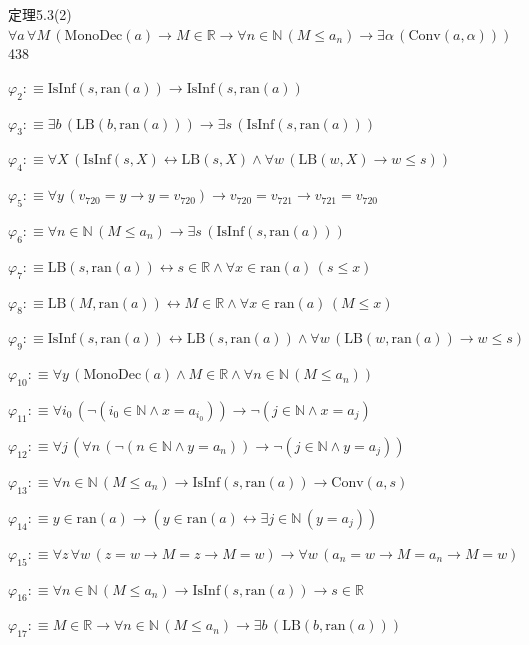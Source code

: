 \begin{fullproof}{定理5.3(2)}{$\forall a\,\forall M\,(\mathrm{MonoDec}(a) \to M \in \mathbb{R} \to \forall n \in \mathbb{N}\,(M \leq a_{n}) \to \exists \alpha\,(\mathrm{Conv}(a,\alpha)))$}{438}
\begin{abbrevlist}
\item $\varphi_{2} :\equiv \mathrm{IsInf}(s,\mathrm{ran}(a)) \to \mathrm{IsInf}(s,\mathrm{ran}(a))$
\item $\varphi_{3} :\equiv \exists b\,(\mathrm{LB}(b,\mathrm{ran}(a))) \to \exists s\,(\mathrm{IsInf}(s,\mathrm{ran}(a)))$
\item $\varphi_{4} :\equiv \forall X\,(\mathrm{IsInf}(s,X) \leftrightarrow \mathrm{LB}(s,X) \land \forall w\,(\mathrm{LB}(w,X) \to w \leq s))$
\item $\varphi_{5} :\equiv \forall y\,(v_{720} = y \to y = v_{720}) \to v_{720} = v_{721} \to v_{721} = v_{720}$
\item $\varphi_{6} :\equiv \forall n \in \mathbb{N}\,(M \leq a_{n}) \to \exists s\,(\mathrm{IsInf}(s,\mathrm{ran}(a)))$
\item $\varphi_{7} :\equiv \mathrm{LB}(s,\mathrm{ran}(a)) \leftrightarrow s \in \mathbb{R} \land \forall x \in \mathrm{ran}(a)\,(s \leq x)$
\item $\varphi_{8} :\equiv \mathrm{LB}(M,\mathrm{ran}(a)) \leftrightarrow M \in \mathbb{R} \land \forall x \in \mathrm{ran}(a)\,(M \leq x)$
\item $\varphi_{9} :\equiv \mathrm{IsInf}(s,\mathrm{ran}(a)) \leftrightarrow \mathrm{LB}(s,\mathrm{ran}(a)) \land \forall w\,(\mathrm{LB}(w,\mathrm{ran}(a)) \to w \leq s)$
\item $\varphi_{10} :\equiv \forall y\,(\mathrm{MonoDec}(a) \land M \in \mathbb{R} \land \forall n \in \mathbb{N}\,(M \leq a_{n}))$
\item $\varphi_{11} :\equiv \forall i_{0}\,(\neg (i_{0} \in \mathbb{N} \land x = a_{i_{0}})) \to \neg (j \in \mathbb{N} \land x = a_{j})$
\item $\varphi_{12} :\equiv \forall j\,(\forall n\,(\neg (n \in \mathbb{N} \land y = a_{n})) \to \neg (j \in \mathbb{N} \land y = a_{j}))$
\item $\varphi_{13} :\equiv \forall n \in \mathbb{N}\,(M \leq a_{n}) \to \mathrm{IsInf}(s,\mathrm{ran}(a)) \to \mathrm{Conv}(a,s)$
\item $\varphi_{14} :\equiv y \in \mathrm{ran}(a) \to (y \in \mathrm{ran}(a) \leftrightarrow \exists j \in \mathbb{N}\,(y = a_{j}))$
\item $\varphi_{15} :\equiv \forall z\,\forall w\,(z = w \to M = z \to M = w) \to \forall w\,(a_{n} = w \to M = a_{n} \to M = w)$
\item $\varphi_{16} :\equiv \forall n \in \mathbb{N}\,(M \leq a_{n}) \to \mathrm{IsInf}(s,\mathrm{ran}(a)) \to s \in \mathbb{R}$
\item $\varphi_{17} :\equiv M \in \mathbb{R} \to \forall n \in \mathbb{N}\,(M \leq a_{n}) \to \exists b\,(\mathrm{LB}(b,\mathrm{ran}(a)))$

\end{abbrevlist}
\end{fullproof}
